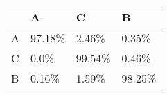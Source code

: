 \begin{table}[!h]
\begin{tabular}{|p{}|p{}|p{}|p{}|}
\hline
& A& C& B\\ \hline
A & 97.18\% & 2.46\% & 0.35\% \\ \hline
C & 0.0\% & 99.54\% & 0.46\% \\ \hline
B & 0.16\% & 1.59\% & 98.25\% \\ \hline
\end{tabular}
\end{table}
